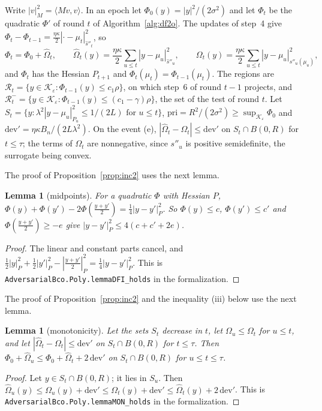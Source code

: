 \documentclass[11pt]{amsart}
\newtheorem{lemma}[theorem]{Lemma}
\theoremstyle{definition}
\numberwithin{equation}{section}
\newcommand{\cK}{\mathcal{K}}
\newcommand{\ip}[1]{\langle #1\rangle}
\begin{document}
Write $|v|_M^2=\ip{Mv,v}$. In an epoch let $\Phi_0(y)=|y|^2/(2\sigma^2)$ and let $\Phi_t$ be the quadratic $\Phi'$ of round $t$ of Algorithm~\ref{alg:df2o}. The updates of step~4 give $\Phi_t-\Phi_{t-1}=\frac{\eta\kappa}2|\cdot-\mu_t|^2_{\hat s''_t}$, so
\[
\Phi_t=\Phi_0+\hat\Omega_t,\qquad\hat\Omega_t(y)=\frac{\eta\kappa}2\sum_{u\le t}|y-\mu_u|^2_{\hat s''_u},\qquad\Omega_t(y)=\frac{\eta\kappa}2\sum_{u\le t}|y-\mu_u|^2_{s''_u(\mu_u)},
\]
and $\Phi_t$ has the Hessian $P_{t+1}$ and $\Phi_t(\mu_t)=\Phi_{t-1}(\mu_t)$. The regions are $\mathcal R_t=\{y\in\cK_\varepsilon:\Phi_{t-1}(y)\le c_1\rho\}$, on which step~6 of round $t-1$ projects, and $\mathcal R^-_t=\{y\in\cK_\varepsilon:\Phi_{t-1}(y)\le(c_1-\gamma)\rho\}$, the set of the test of round $t$. Let $S_t=\{y:\lambda^2|y-\mu_u|^2_{P_u}\le1/(2L)\text{ for }u\le t\}$, $\mathrm{pri}=R^2/(2\sigma^2)\ge\sup_{\cK_\varepsilon}\Phi_0$ and $\mathrm{dev}'=\eta\kappa B_n/(2L\lambda^2)$. On the event (e), $|\hat\Omega_t-\Omega_t|\le\mathrm{dev}'$ on $S_t\cap B(0,R)$ for $t\le\tau$; the terms of $\Omega_t$ are nonnegative, since $s''_u$ is positive semidefinite, the surrogate being convex.

The proof of Proposition~\ref{prop:inc2} uses the next lemma.

\begin{lemma}[midpoints]\label{lem:dfi}
For a quadratic $\Phi$ with Hessian $P$, $\Phi(y)+\Phi(y')-2\Phi(\frac{y+y'}2)=\frac14|y-y'|^2_P$. So $\Phi(y)\le c$, $\Phi(y')\le c'$ and $\Phi(\frac{y+y'}2)\ge-e$ give $|y-y'|^2_P\le4(c+c'+2e)$.
\end{lemma}

\begin{proof}
The linear and constant parts cancel, and $\frac12|y|^2_P+\frac12|y'|^2_P-|\frac{y+y'}2|^2_P=\frac14|y-y'|^2_P$.
This is \texttt{AdversarialBco.Poly.lemmaDFI\_holds} in the formalization.
\end{proof}

The proof of Proposition~\ref{prop:inc2} and the inequality (iii) below use the next lemma.

\begin{lemma}[monotonicity]\label{lem:mon}
Let the sets $S_t$ decrease in $t$, let $\Omega_u\le\Omega_t$ for $u\le t$, and let $|\hat\Omega_t-\Omega_t|\le\mathrm{dev}'$ on $S_t\cap B(0,R)$ for $t\le\tau$. Then $\Phi_0+\hat\Omega_u\le\Phi_0+\hat\Omega_t+2\,\mathrm{dev}'$ on $S_t\cap B(0,R)$ for $u\le t\le\tau$.
\end{lemma}

\begin{proof}
Let $y\in S_t\cap B(0,R)$; it lies in $S_u$. Then $\hat\Omega_u(y)\le\Omega_u(y)+\mathrm{dev}'\le\Omega_t(y)+\mathrm{dev}'\le\hat\Omega_t(y)+2\,\mathrm{dev}'$.
This is \texttt{AdversarialBco.Poly.lemmaMON\_holds} in the formalization.
\end{proof}
\end{document}
